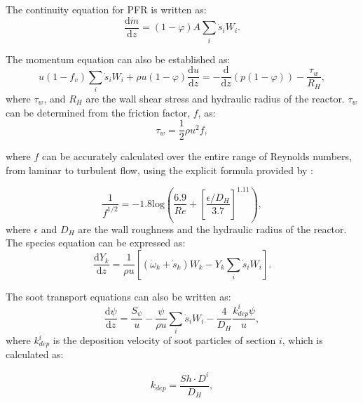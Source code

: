 The continuity equation for PFR is written as:
\begin{equation}
	\frac{\mathrm{d}\dot{m}}{\mathrm{d}z} =(1-\varphi)A \sum_i \dot s_i W_i
	\label{eqn:contpfr}.
\end{equation}

The momentum equation can also be established as:
\begin{equation}
	u (1-f_v) \sum_i \dot s_i W_i + \rho u (1-\varphi) \frac{\mathrm{d}u}{\mathrm{d}z}
	=-\frac{\mathrm{d}}{\mathrm{d}z}(p(1-\varphi))-\frac{\tau_{w}}{R_H} 
	\label{eqn:momenpfr},
\end{equation}
\noindent where $\tau_w$, and $R_H$ are the wall shear stress and hydraulic radius of the reactor. $\tau_w$ can be determined from the friction factor, $f$, as:
\begin{equation}
	\tau_w = \frac{1}{2}\rho u^2 f, 
	\label{eqn:wallshearpfr}
\end{equation}

\noindent where $f$ can be accurately calculated over the entire range of Reynolds numbers, from laminar to turbulent flow, using the explicit formula provided by \citet{haaland1983simple}:


\begin{equation}
	\frac{1}{f^{1/2}} = -1.8 \mathrm{log}
	\left(
	\frac{6.9}{Re}+
	\left[ \frac{\epsilon/D_H}{3.7} \right]^{1.11}
	\right)
	\label{eqn:fpfr},
\end{equation}
\noindent where $\epsilon$ and ${D_H}$ are the wall roughness and the hydraulic radius of the reactor. The species equation can be expressed as:
\begin{equation}
	\frac{\mathrm{d} Y_k}{\mathrm{d} z}=\frac{1}{\rho u}\left[\left(\dot{\omega}_k+\dot{s}_k\right) W_k-Y_k \sum_i \dot{s}_i W_i\right]
	\label{eqn:speciespfr}.
\end{equation}

The soot transport equations can also be written as:
\begin{equation}
	\frac{\mathrm{d} \psi}{\mathrm{d} z}=
	\frac{S_{\psi}}{u}
	-\frac{\psi}{\rho u}\sum_i \dot{s}_i W_i
	-\frac{4}{D_H}\frac{k^i_{dep}\psi}{u},
	\label{eqn:sootpfr}
\end{equation}
\noindent where $k^i_{dep}$ is the deposition velocity of soot particles of section $i$, which is calculated as:

\begin{equation}
	k_{dep}=
	\frac{Sh\cdot D^i}{D_H},
	\label{eqn:kdep}
\end{equation}

